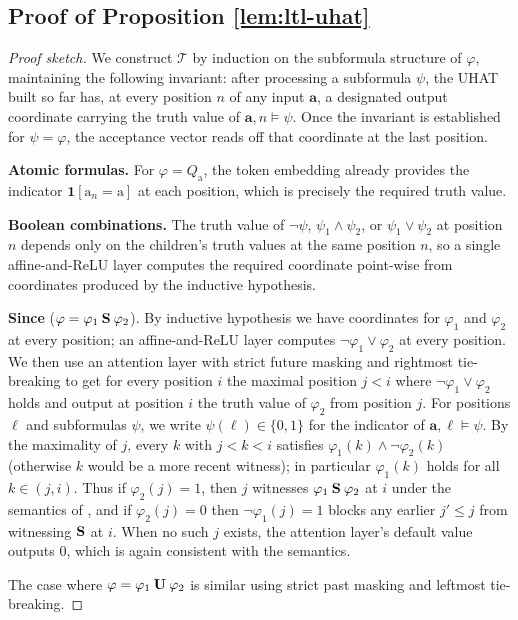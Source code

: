 \documentclass{article} %
\newcommand{\opbf}[1]{\textnormal{\textbf{#1}}}
\newcommand{\since}{\mathbin{\opbf{S}}}
\newcommand{\until}{\mathbin{\opbf{U}}}
\newcommand{\indicator}[1]{\mathbf{1}\!\left[#1\right]}
\newcommand{\sym}[1]{\mathrm{#1}}
\newcommand{\str}[1]{#1}
\newcommand{\bword}{\mathbf{a}}
\newcommand{\trans}{\mathcal{T}}
\newcommand{\Qprop}[1]{Q_{#1}}
\begin{document}
\subsection{Proof of Proposition \ref{lem:ltl-uhat}}\label{app:LTL-UHAT}
\propLTLUHAT*
\begin{proof}[Proof sketch]
We construct $\trans$ by induction on the subformula structure of $\varphi$, maintaining the following invariant: after processing a subformula $\psi$, the UHAT built so far has, at every position $n$ of any input $\str{\bword}$, a designated output coordinate carrying the truth value of $\str{\bword}, n \models \psi$. Once the invariant is established for $\psi = \varphi$, the acceptance vector reads off that coordinate at the last position.

\textbf{Atomic formulas.} For $\varphi = \Qprop{\sym{a}}$, the token embedding already provides the indicator $\indicator{\sym{a}_n = \sym{a}}$ at each position, which is precisely the required truth value.

\textbf{Boolean combinations.} The truth value of $\neg\psi$, $\psi_1 \wedge \psi_2$, or $\psi_1 \vee \psi_2$ at position $n$ depends only on the children's truth values at the same position $n$, so a single affine-and-ReLU layer computes the required coordinate point-wise from coordinates produced by the inductive hypothesis.


\textbf{Since} ($\varphi = \varphi_1 \since \varphi_2$). By inductive hypothesis we have coordinates for $\varphi_1$ and $\varphi_2$ at every position; an affine-and-ReLU layer computes $\neg\varphi_1 \vee \varphi_2$ at every position.
We then use an attention layer with strict future masking and rightmost tie-breaking
to get for every position $i$ the maximal position $j < i$ where $\neg\varphi_1 \vee \varphi_2$ holds and
output at position $i$ the truth value of $\varphi_2$ from position $j$.
For positions $\ell$ and subformulas $\psi$, we write $\psi(\ell) \in \{0,1\}$ for the indicator of $\str{\bword}, \ell \models \psi$. By the maximality of $j$, every $k$ with $j < k < i$ satisfies $\varphi_1(k) \wedge \neg\varphi_2(k)$ (otherwise $k$ would be a more recent witness); in particular $\varphi_1(k)$ holds for all  $k \in (j,i)$. Thus if $\varphi_2(j) = 1$, then $j$ witnesses $\varphi_1 \since \varphi_2$ at $i$ under the semantics of , and if $\varphi_2(j) = 0$ then $\neg\varphi_1(j) = 1$ blocks any earlier $j' \le j$ from witnessing $\since$ at $i$. When no such $j$ exists, the attention layer's default value outputs $0$, which is again consistent with the semantics.

The case where $\varphi = \varphi_1 \until \varphi_2$ is similar using strict past masking and leftmost tie-breaking.
\end{proof}
\end{document}
